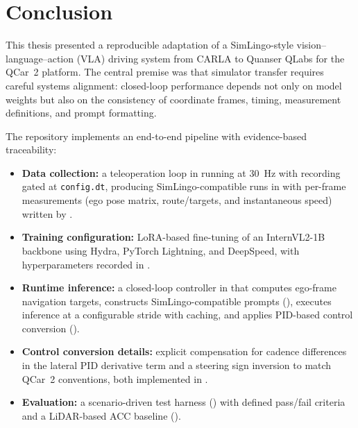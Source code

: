 \chapter{Conclusion}
\label{ch:conclusion}

This thesis presented a reproducible adaptation of a SimLingo-style vision--language--action (VLA) driving system from CARLA to Quanser QLabs for the QCar~2 platform. The central premise was that simulator transfer requires careful systems alignment: closed-loop performance depends not only on model weights but also on the consistency of coordinate frames, timing, measurement definitions, and prompt formatting.

The repository implements an end-to-end pipeline with evidence-based traceability:
\begin{itemize}[leftmargin=*,itemsep=0.25em]
  \item \textbf{Data collection:} a teleoperation loop in  running at \SI{30}{Hz} with recording gated at \texttt{config.dt}, producing SimLingo-compatible runs in  with per-frame measurements (ego pose matrix, route/targets, and instantaneous speed) written by .
  \item \textbf{Training configuration:} LoRA-based fine-tuning of an InternVL2-1B backbone using Hydra, PyTorch Lightning, and DeepSpeed, with hyperparameters recorded in .
  \item \textbf{Runtime inference:} a closed-loop controller in  that computes ego-frame navigation targets, constructs SimLingo-compatible prompts (), executes inference at a configurable stride with caching, and applies PID-based control conversion ().
  \item \textbf{Control conversion details:} explicit compensation for cadence differences in the lateral PID derivative term and a steering sign inversion to match QCar~2 conventions, both implemented in .
  \item \textbf{Evaluation:} a scenario-driven test harness () with defined pass/fail criteria and a LiDAR-based ACC baseline ().
\end{itemize}

